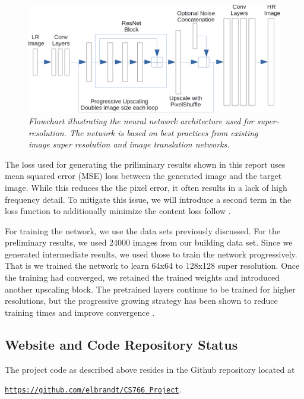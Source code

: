 \documentclass{article}
\begin{document}
\begin{figure}[h!]
\includegraphics[width=\textwidth]{midterm_results/network_arch.png}
\caption{\textit{Flowchart illustrating the neural network architecture used for super-resolution. The network is based on best practices from existing image super resolution and image translation networks.}} \label{fig:nn_arch}
\end{figure}

The loss used for generating the priliminary results shown in this report uses mean squared error (MSE) loss between the generated image and the target image. While this reduces the the pixel error, it often results in a lack of high frequency detail. To mitigate this issue, we will introduce a second term in the loss function to additionally minimize the content loss follow \cite{johnson2016perceptual}.

For training the network, we use the data sets previously discussed. For the preliminary results, we used 24000 images from our building data set. Since we generated intermediate results, we used those to train the network progressively. That is we trained the network to learn 64x64 to 128x128 super resolution. Once the training had converged, we retained the trained weights and introduced another upscaling block. The pretrained layers continue to be trained for higher resolutions, but the progressive growing strategy has been shown to reduce training times and improve convergence \cite{lai2017deep,karras2017progressive}. 



\subsection{Website and Code Repository Status}
The project code as described above resides in the Github repository located at

\texttt{\href{https://github.com/elbrandt/CS766_Project}{https://github.com/elbrandt/CS766\_Project}}.
\end{document}
